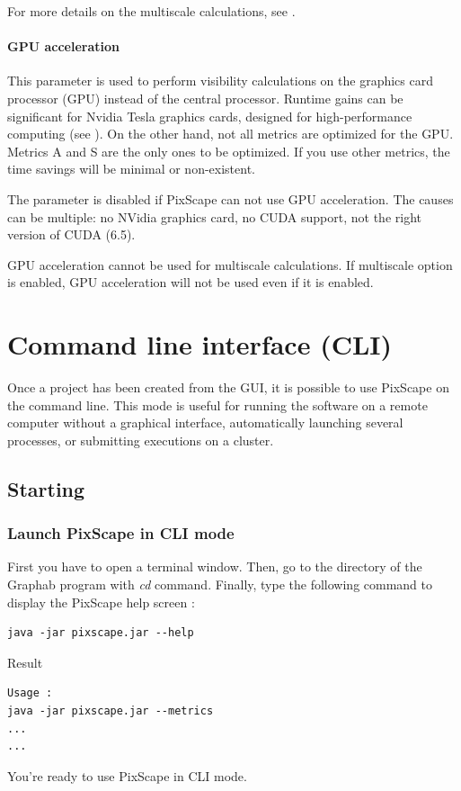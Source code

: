 \documentclass{report}
\begin{document}
For more details on the multiscale calculations, see .


\subsubsection{GPU acceleration}
This parameter is used to perform visibility calculations on the graphics card processor (GPU) instead of the central processor. Runtime gains can be significant for Nvidia Tesla graphics cards, designed for high-performance computing (see ). On the other hand, not all metrics are optimized for the GPU. Metrics A and S are the only ones to be optimized. If you use other metrics, the time savings will be minimal or non-existent.

The parameter is disabled if PixScape can not use GPU acceleration. The causes can be multiple: no NVidia graphics card, no CUDA support, not the right version of CUDA (6.5).

GPU acceleration cannot be used for multiscale calculations. If multiscale option is enabled, GPU acceleration will not be used even if it is enabled.


\chapter{Command line interface (CLI)}
\label{cli}
Once a project has been created from the GUI, it is possible to use PixScape on the command line. This mode is useful for running the software on a remote computer without a graphical interface, automatically launching several processes, or submitting executions on a cluster.

\section{Starting}

\subsection{Launch PixScape in CLI mode}
First you have to open a terminal window. Then, go to the directory of the Graphab program with \textit{cd} command. Finally, type the following command to display the PixScape help screen :
\begin{Verbatim}
java -jar pixscape.jar --help
\end{Verbatim}
Result
\begin{Verbatim}
Usage :
java -jar pixscape.jar --metrics
...
...
\end{Verbatim}
You’re ready to use PixScape in CLI mode.
\end{document}
